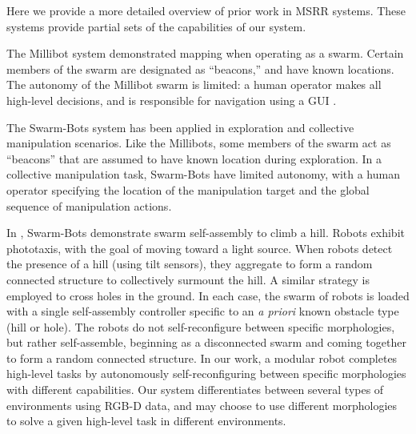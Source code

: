 \documentclass[12pt]{article}
\begin{document}
Here we provide a more detailed overview of prior work in MSRR systems.  These systems provide partial sets of the capabilities of our system.
 
The Millibot system demonstrated mapping when operating as a swarm. Certain members of the swarm are designated as ``beacons,'' and have known locations. The autonomy of the Millibot swarm is limited: a human operator makes all high-level decisions, and is responsible for navigation using a GUI \cite{Grabowski2000}.

The Swarm-Bots system has been applied in exploration \cite{Dorigo2005} and collective manipulation \cite{Mondada2005} scenarios.  Like the Millibots, some members of the swarm act as ``beacons'' that are assumed to have known location during exploration.  In a collective manipulation task, Swarm-Bots have limited autonomy, with a human operator specifying the location of the manipulation target and the global sequence of manipulation actions.

%
In \cite{o2010self}, Swarm-Bots demonstrate swarm self-assembly to climb a hill.  Robots exhibit phototaxis, with the goal of moving toward a light source.  When robots detect the presence of a hill (using tilt sensors), they aggregate to form a random connected structure to collectively surmount the hill. A similar strategy is employed to cross holes in the ground.  In each case, the swarm of robots is loaded with a single self-assembly controller specific to an \textit{a priori} known obstacle type (hill or hole).  The robots do not self-reconfigure between specific morphologies, but rather self-assemble, beginning as a disconnected swarm and coming together to form a random connected structure.  In our work, a modular robot completes high-level tasks by autonomously self-reconfiguring between specific morphologies with different capabilities.  Our system differentiates between several types of environments using RGB-D data, and may choose to use different morphologies to solve a given high-level task in different environments.    
 
\end{document}
